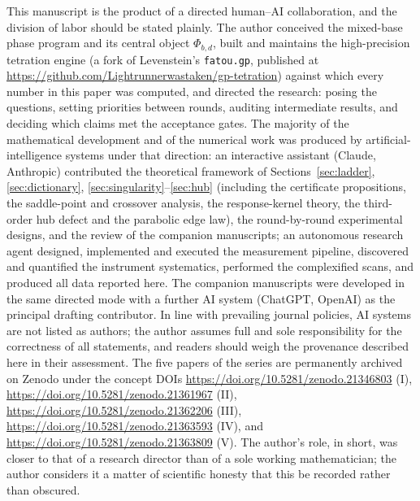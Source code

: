 \documentclass[11pt,a4paper]{article}
\theoremstyle{definition}
\theoremstyle{remark}
\begin{document}
This manuscript is the product of a directed human--AI collaboration, and the division of
labor should be stated plainly. The author conceived the mixed-base phase program and its
central object $\Phi_{b,d}$, built and maintains the high-precision tetration engine (a fork
of Levenstein's \texttt{fatou.gp}, published at \url{https://github.com/Lightrunnerwastaken/gp-tetration}) against which every number in this paper was computed,
and directed the research: posing the questions, setting priorities between rounds,
auditing intermediate results, and deciding which claims met the acceptance gates. The
majority of the mathematical development and of the numerical work was produced by
artificial-intelligence systems under that direction: an interactive assistant (Claude,
Anthropic) contributed the theoretical framework of Sections~\ref{sec:ladder},
\ref{sec:dictionary}, \ref{sec:singularity}--\ref{sec:hub} (including the certificate
propositions, the saddle-point and crossover analysis, the response-kernel theory, the
third-order hub defect and the parabolic edge law), the round-by-round experimental designs,
and the review of the companion manuscripts; an autonomous research agent designed,
implemented and executed the measurement pipeline, discovered and quantified the instrument
systematics, performed the complexified scans, and produced all data reported here. The
companion manuscripts \cite{phaselaw,unified} were developed in the same directed mode with
a further AI system (ChatGPT, OpenAI) as the principal drafting contributor. In line with
prevailing journal policies, AI systems are not listed as authors; the author assumes full
and sole responsibility for the correctness of all statements, and readers should weigh the
provenance described here in their assessment. The five papers of the series are permanently archived on Zenodo under the concept DOIs \url{https://doi.org/10.5281/zenodo.21346803} (I), \url{https://doi.org/10.5281/zenodo.21361967} (II), \url{https://doi.org/10.5281/zenodo.21362206} (III), \url{https://doi.org/10.5281/zenodo.21363593} (IV), and \url{https://doi.org/10.5281/zenodo.21363809} (V). The author's role, in short, was closer to
that of a research director than of a sole working mathematician; the author considers it a
matter of scientific honesty that this be recorded rather than obscured.
\end{document}
